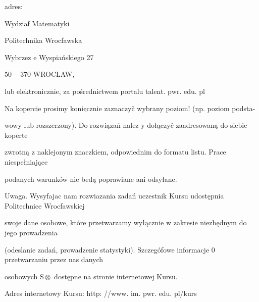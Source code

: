 \documentclass[a4paper,12pt]{article}
\begin{document}
adres:

Wydziaf Matematyki

Politechnika Wrocfawska

Wybrzez $\mathrm{e}$ Wyspiańskiego 27

$50-370$ WROCLAW,

lub elektronicznie, za pośrednictwem portalu talent. $\mathrm{p}\mathrm{w}\mathrm{r}$. edu. pl

Na kopercie prosimy $\underline{\mathrm{k}\mathrm{o}\mathrm{n}\mathrm{i}\mathrm{e}\mathrm{c}\mathrm{z}\mathrm{n}\mathrm{i}\mathrm{e}}$ zaznaczyč wybrany poziom! (np. poziom podsta-

wowy lub rozszerzony). Do rozwiązań nalez $\mathrm{y}$ dołączyč zaadresowaną do siebie koperte

zwrotną $\mathrm{z}$ naklejonym znaczkiem, odpowiednim do formatu listu. Prace niespełniające

podanych warunków nie bedą poprawiane ani odsyłane.

Uwaga. Wysyfajac nam rozwiazania zadań uczestnik Kursu udostępnia Politechnice Wrocfawskiej

swoje dane osobowe, które przetwarzamy wyłącznie $\mathrm{w}$ zakresie niezbędnym do jego prowadzenia

(odeslanie zadań, prowadzenie statystyki). Szczegófowe informacje $0$ przetwarzaniu przez nas danych

osobowych $\mathrm{S}\otimes$ dostępne na stronie internetowej Kursu.

Adres internetowy Kursu: http: //www. im. pwr. edu. pl/kurs
\end{document}
